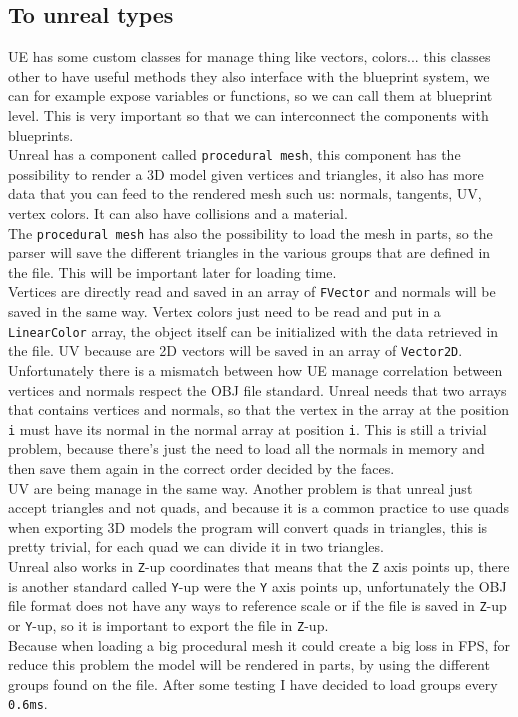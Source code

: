 \subsection{To unreal types}
\noindent
\ac{UE} has some custom classes for manage thing like vectors, colors... this classes other to have useful methods they also interface with the blueprint system, we can for example expose variables or functions, so we can call them at blueprint level.
This is very important so that we can interconnect the \cpp components with blueprints.\\
Unreal has a component called \verb|procedural mesh|, this component has the possibility to render a 3D model given vertices and triangles, it also has more data that you can feed to the rendered mesh such us: normals, tangents, UV, vertex colors.
It can also have collisions and a material.\\
The \verb|procedural mesh| has also the possibility to load the mesh in parts, so the parser will save the different triangles in the various groups that are defined in the file.
This will be important later for loading time.\\
Vertices are directly read and saved in an array of \verb|FVector| and normals will be saved in the same way.
Vertex colors just need to be read and put in a \verb|LinearColor| array, the object itself can be initialized with the data retrieved in the file.
UV because are 2D vectors will be saved in an array of \verb|Vector2D|.
Unfortunately there is a mismatch between how \ac{UE} manage correlation between vertices and normals respect the OBJ file standard.
Unreal needs that two arrays that contains vertices and normals, so that the vertex in the array at the position \verb|i| must have its normal in the normal array at position \verb|i|. 
This is still a trivial problem, because there's just the need to load all the normals in memory and then save them again in the correct order decided by the faces.\\
UV are being manage in the same way.
Another problem is that unreal just accept triangles and not quads, and because it is a common practice to use quads when exporting 3D models the program will convert quads in triangles, this is pretty trivial, for each quad we can divide it in two triangles.\\
Unreal also works in \verb|Z|-up coordinates that means that the \verb|Z| axis points up, there is another standard called \verb|Y|-up were the \verb|Y| axis points up, unfortunately the OBJ file format does not have any ways to reference scale or if the file is saved in \verb|Z|-up or \verb|Y|-up,
so it is important to export the file in \verb|Z|-up.\\

Because when loading a big procedural mesh it could create a big loss in \ac{FPS}, for reduce this problem the model will be rendered in parts, by using the different groups found on the file. After some testing I have decided to load groups every \verb|0.6ms|. 